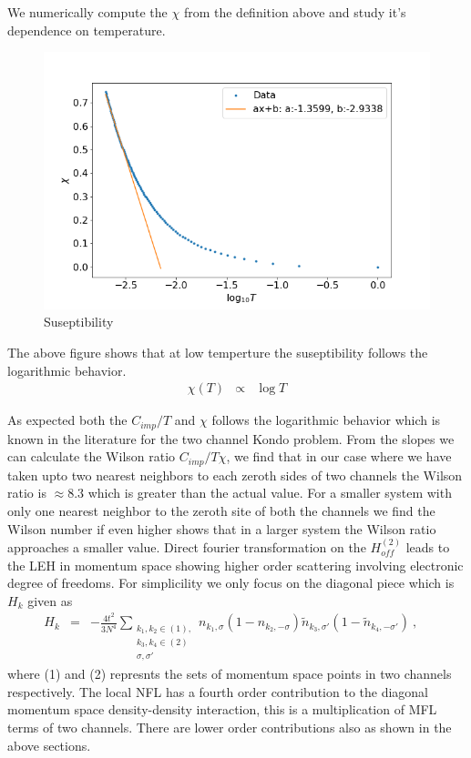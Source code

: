 \documentclass[reprint,prb,superscriptaddress]{revtex4-1}
\begin{document}
We numerically compute the $\chi$ from the definition above and study it's dependence on temperature.
\begin{figure}[!h]
\centering
\includegraphics[scale=0.36]{plt/NFL_Chi_log_0p1}
\caption{Suseptibility}
\label{fig:NFL_susecptibility}
\end{figure}
The above figure shows that at low temperture the suseptibility follows the logarithmic behavior.
\begin{eqnarray}
\chi(T) &\propto& \log T
\end{eqnarray}

\noindent As expected both the $C_{imp}/T$ and $\chi$ follows the logarithmic behavior which is known in the literature for the two channel Kondo problem. From the slopes we can calculate the Wilson ratio $C_{imp}/T\chi$, we find that in our case where we have taken upto two nearest neighbors to each zeroth sides of two channels the Wilson ratio is $\approx 8.3$ which is greater than the actual value. For a smaller system with only one nearest neighbor to the zeroth site of both the channels we find the Wilson number if even higher shows that in a larger system the Wilson ratio approaches a smaller value. Direct fourier transformation on the $H^{(2)}_{off}$ leads to the LEH in momentum space showing higher order scattering involving electronic degree of freedoms. For simplicility we only focus on the diagonal piece which is $H_k$ given as
\begin{eqnarray}
H_k&=&-\frac{4t^2}{3 N^4} \displaystyle\sum_{\substack{k_1,k_2\in (1),\\ k_3,k_4\in (2)\\ \sigma,\sigma'}} n_{k_1,\sigma} (1-n_{k_2,-\sigma})  \tilde{n}_{k_3,\sigma'} (1-\tilde{n}_{k_4,-\sigma'}) ~,~~~~\nonumber
\end{eqnarray}
where (1) and (2) represnts the sets of momentum space points in two channels respectively. The local NFL has a fourth order contribution to the diagonal momentum space density-density interaction, this is a multiplication of MFL terms of two channels. There are lower order contributions also as shown in the above sections.
\end{document}

